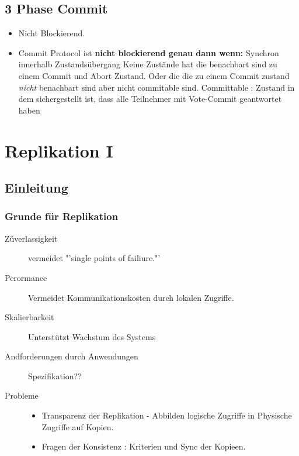 \documentclass[a4paper,10pt,titlepage=false]{scrreprt}
\begin{document}
\section{3 Phase Commit} %
\label{sec:3_phase_commit}
\begin{itemize}
  \item Nicht Blockierend.
  \item Commit Protocol ist \textbf{nicht blockierend genau dann wenn:}
  \subitem Synchron innerhalb Zustandsübergang
  \subitem Keine Zustände hat die benachbart sind zu einem Commit und Abort Zustand. Oder die die zu einem Commit zustand \textit{nicht} benachbart sind aber nicht commitable sind.
  \subitem Committable : Zustand in dem sichergestellt ist, dass alle
Teilnehmer mit Vote-Commit geantwortet haben
\end{itemize}

\chapter{Replikation I} %
\label{cha:replikation_i}

\section{Einleitung} %
\label{sec:einleitung}
\subsection{Grunde für Replikation} %
\label{sub:grunde_f_r_replikation}
\begin{description}
  \item[Züverlassigkeit] vermeidet "'single points of failiure."'
  \item[Perormance] Vermeidet Kommunikationskosten durch lokalen Zugriffe.
  \item[Skalierbarkeit] Unterstützt Wachstum des Systems
  \item[Andforderungen durch Anwendungen] Spezifikation??
  \item[Probleme] \begin{itemize}
    \item Transparenz der Replikation - Abbilden logische Zugriffe in Physische Zugriffe auf Kopien.
    \item Fragen der Konsistenz : Kriterien und Sync der Kopieen.
  \end{itemize} 
\end{description}
\end{document}
